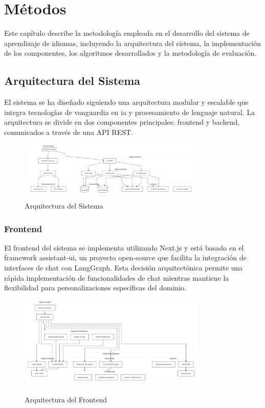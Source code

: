 \chapter{Métodos}
\label{metodos}

Este capítulo describe la metodología empleada en el desarrollo del sistema de aprendizaje de idiomas, incluyendo la arquitectura del sistema, la implementación de los componentes, los algoritmos desarrollados y la metodología de evaluación.

\section{Arquitectura del Sistema}
\label{arquitectura-sistema}

El sistema se ha diseñado siguiendo una arquitectura modular y escalable que integra tecnologías de vanguardia en \gls{ia} y procesamiento de lenguaje natural. La arquitectura se divide en dos componentes principales: frontend y backend, comunicados a través de una API REST.

\begin{figure}[H]
  \centering
  \includegraphics[width=0.8\textwidth]{figuras/architecture.png}
    \caption{Arquitectura del Sistema}
    \label{fig:arquitectura-sistema}
\end{figure}


\subsection{Frontend}
\label{frontend}

El frontend del sistema se implementa utilizando Next.js y está basado en el framework \gls{assistant-ui}, un proyecto \gls{open-source} que facilita la integración de interfaces de chat con LangGraph. Esta decisión arquitectónica permite una rápida implementación de funcionalidades de chat mientras mantiene la flexibilidad para personalizaciones específicas del dominio.

\begin{figure}[H]
    \centering
    \caption{Arquitectura del Frontend}
    \includegraphics[width=0.8\textwidth]{figuras/frontend.png}
    \label{fig:arquitectura-frontend}
\end{figure}

